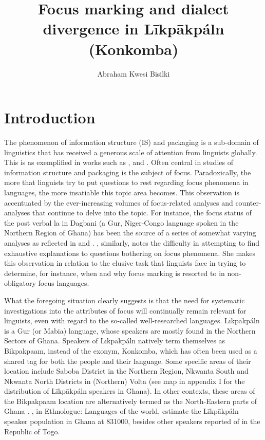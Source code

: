\documentclass[output=paper,colorlinks,citecolor=brown]{langscibook}
\author{Abraham Kwesi Bisilki\affiliation{University of Education, Winneba, Ghana}}
\title{Focus marking and dialect divergence in Līkpākpáln (Konkomba)}
\begin{document}
\maketitle

\section{Introduction}\label{sec:bisilki:1}

The phenomenon of information structure (IS) and packaging is a sub-domain of linguistics that has received a generous scale of attention from linguists globally. This is as exemplified in works such as \citet{Lambrecht1994, Krifka2007, Krifka2007, SchwabeWinkler2007, Ameka2010, ZimmermannOnea2011}, and \citet{VanPutten2014}. Often central in studies of information structure and packaging is the subject of focus. Paradoxically, the more that linguists try to put questions to rest regarding focus phenomena in languages, the more insatiable this topic area becomes. This observation is accentuated by the ever-increasing volumes of focus-related analyses and counter-analyses that continue to delve into the topic. For instance, the focus status of the post verbal la in Dagbani (a Gur, Niger-Congo language spoken in the Northern Region of Ghana) has been the source of a series of somewhat varying analyses as reflected in \citet{Olawsky1999,Hudu2012} and \citet{Issah2013Focus}. \citet[94]{VanPutten2016}, similarly, notes the difficulty in attempting to find exhaustive explanations to questions bothering on focus phenomena. She makes this observation in relation to the elusive task that linguists face in trying to determine, for instance, when and why focus marking is resorted to in non-obligatory focus languages.

What the foregoing situation clearly suggests is that the need for systematic investigations into the attributes of focus will continually remain relevant for linguists, even with regard to the so-called well-researched languages. Līkpākpáln is a Gur (or Mabia) language, whose speakers are mostly found in the Northern Sectors of Ghana. Speakers of Līkpākpáln natively term themselves as Bikpakpaam, instead of the exonym, Konkomba, which has often been used as a shared tag for both the people and their language. Some specific areas of their location include Saboba District in the Northern Region, Nkwanta South and Nkwanta North Districts in (Northern) Volta (see map in appendix I for the distribution of Līkpākpáln speakers in Ghana). In other contexts, these areas of the Bikpakpaam location are alternatively termed as the North-Eastern parts of Ghana \citep[182]{Schwarz2009}. \citet{SimonsFennig2017, SimonsFennig2018}, in Ethnologue: Languages of the world, estimate the Līkpākpáln speaker population in Ghana at 831000, besides other speakers reported of in the Republic of Togo.
\end{document}

